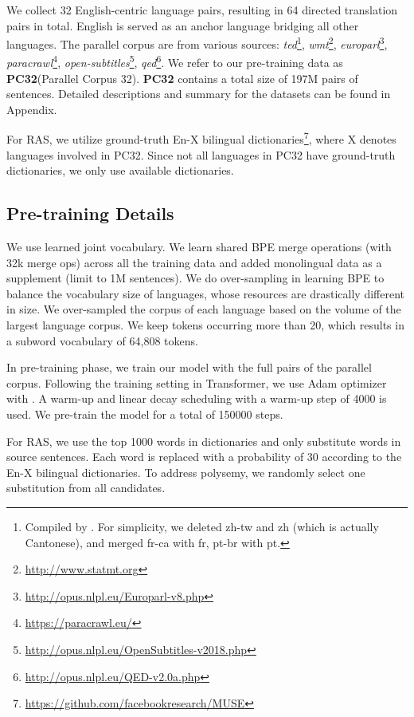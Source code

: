 \documentclass[11pt,a4paper]{article}
\newcommand{\dataset}{PC32\xspace}
\begin{document}
We collect 32 English-centric language pairs, resulting in 64 directed translation pairs in total. English is served as an anchor language bridging all other languages. 
The parallel corpus are from various sources: \textit{ted}\footnote{Compiled by \citet{DBLP:conf/naacl/QiSFPN18}. For simplicity, we deleted zh-tw and zh (which is actually Cantonese), and merged fr-ca with fr, pt-br with pt.}, \textit{wmt}\footnote{\url{http://www.statmt.org}}, \textit{europarl}\footnote{\url{http://opus.nlpl.eu/Europarl-v8.php}}, \textit{paracrawl}\footnote{\url{https://paracrawl.eu/}}, \textit{open-subtitles}\footnote{\url{http://opus.nlpl.eu/OpenSubtitles-v2018.php}}, \textit{qed}\footnote{\url{http://opus.nlpl.eu/QED-v2.0a.php}}. 
We refer to our pre-training data as \textbf{\dataset}(Parallel Corpus 32). 
\textbf{\dataset} contains a total size of 197M pairs of sentences.
Detailed descriptions and summary for the datasets can be found in Appendix.



For RAS, we utilize ground-truth En-X bilingual dictionaries\footnote{\url{https://github.com/facebookresearch/MUSE}}, where X denotes languages involved in \dataset. Since not all languages in \dataset have ground-truth dictionaries, we only use available dictionaries.





\subsection{Pre-training Details}

We use learned joint vocabulary. We learn shared BPE \cite{sennrich2015neural} merge operations (with 32k merge ops) across all the training data and added monolingual data as a supplement (limit to 1M sentences).
We do over-sampling in learning BPE to balance the vocabulary size of languages, whose resources are drastically different in size. We over-sampled the corpus of each language based on the volume of the largest language corpus. We keep tokens occurring more than 20, which results in a subword vocabulary of 64,808 tokens.

In pre-training phase, we train our model with the full pairs of the parallel corpus. Following the training setting in Transformer, we use Adam optimizer with . A warm-up and linear decay scheduling with a warm-up step of 4000 is used. We pre-train the model for a total of 150000 steps. 

For RAS, we use the top 1000 words in dictionaries and only substitute words in source sentences. Each word is replaced with a probability of 30 according to the En-X bilingual dictionaries. To address polysemy, we randomly select one substitution from all candidates.
\end{document}
